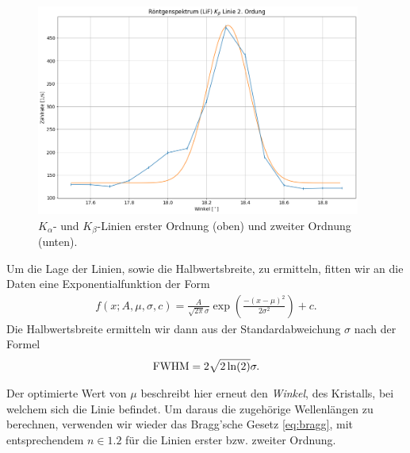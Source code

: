 \begin{figure}[H]
\begin{minipage}{0.5\textwidth}
\end{minipage}\hfill
\begin{minipage}{0.5\textwidth}
    \centering
    \includegraphics[width=0.95\textwidth]{files/plots/lif_kbeta_2ord.png}
\end{minipage}
\caption{$K_{\alpha}$- und $K_{\beta}$-Linien erster Ordnung (oben) und zweiter Ordnung (unten).}
\label{fig:lif_kalpha_kbeta}
\end{figure}

Um die Lage der Linien, sowie die Halbwertsbreite, zu ermitteln, fitten wir an die Daten eine Exponentialfunktion der Form
\begin{align}
  f(x;A,\mu,\sigma,c) = \frac{A}{\sqrt{2 \pi}\sigma} \exp(\frac{-(x - \mu)^2}{2 \sigma^2}) + c.
\end{align}
Die Halbwertsbreite ermitteln wir dann aus der Standardabweichung $\sigma$ nach der Formel
\begin{align}
  \mathrm{FWHM} = 2\sqrt{2\ln(2)}\sigma.
\end{align}

Der optimierte Wert von $\mu$ beschreibt hier erneut den \textit{Winkel}, des Kristalls, bei welchem sich die Linie befindet. Um daraus die zugehörige Wellenlängen zu berechnen, verwenden wir wieder das Bragg'sche Gesetz \eqref{eq:bragg}, mit entsprechendem $n \in \qty{1,2}$ für die Linien erster bzw. zweiter Ordnung.

